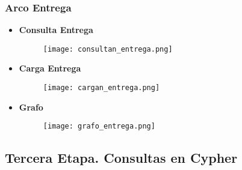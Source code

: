 \documentclass[a4paper]{article}
\begin{document}
\subsubsection{\Large{Arco Entrega}}

\begin{itemize}

    \item \textbf{\large{Consulta Entrega}}

    \begin{figure}[H]
        \centering
        \texttt{[image: consultan\_entrega.png]}
        \label{fig:consultan_entrega}
    \end{figure}

    \item \textbf{\large{Carga Entrega}}

    \begin{figure}[H]
        \centering
        \texttt{[image: cargan\_entrega.png]}
        \label{fig:cargan_entrega}
    \end{figure}

\newpage

    \item \textbf{\large{Grafo}}

    \begin{figure}[H]
        \centering
        \texttt{[image: grafo\_entrega.png]}
        \label{fig:grafo_entrega}
    \end{figure}

\end{itemize}

\newpage

\subsection{\huge{Tercera Etapa. Consultas en Cypher}}
\end{document}
